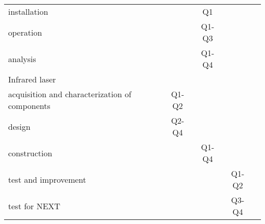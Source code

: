 \begin{center}
\begin{tabular}{| l | c | c | c | c |}
\hline
\hline
installation  &  & Q1 & & \\
operation &  & Q1-Q3 & & \\
analysis &  & Q1-Q4 & & \\
\hline
\hline
\multicolumn{5}{|l|}{Infrared laser}  \\
\hline
\hline
acquisition and characterization of components  & Q1-Q2 & & &  \\
design  & Q2-Q4  & & & \\
construction &  & Q1-Q4 & & \\
test and improvement &  & & Q1-Q2 & \\
test for NEXT & & & Q3-Q4 & \\
\hline
\end{tabular}
\label{tab:schedule_calibration}
\end{center}
